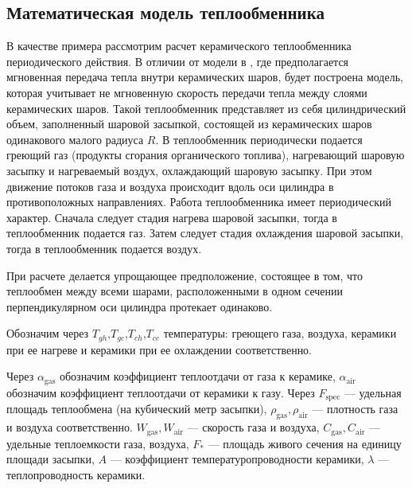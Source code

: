 \documentclass[a4paper,11pt,numreferences,mathsec,kaplist]{isuepsutf8}
\begin{document}
\begin{article}
\section{Математическая модель теплообменника}

В качестве примера рассмотрим расчет керамического теплообменника
периодического действия. В отличии от модели в \cite{KMP2018}, где
предполагается мгновенная передача тепла внутри керамических шаров,
будет построена модель, которая учитывает не мгновенную скорость
передачи тепла между слоями керамических шаров. Такой теплообменник
представляет из себя цилиндрический объем, заполненный шаровой
засыпкой, состоящей из керамических шаров одинакового малого радиуса
$R$. В теплообменник периодически подается греющий газ (продукты
сгорания органического топлива), нагревающий шаровую засыпку и
нагреваемый воздух, охлаждающий шаровую засыпку. При этом движение
потоков газа и воздуха происходит вдоль оси цилиндра в противоположных
направлениях. Работа теплообменника имеет периодический характер.
Сначала следует стадия нагрева шаровой засыпки, тогда в теплообменник
подается газ. Затем следует стадия охлаждения шаровой засыпки, тогда в
теплообменник подается воздух.

При расчете делается упрощающее предположение, состоящее в том, что
теплообмен между всеми шарами, расположенными в одном сечении
перпендикулярном оси цилиндра протекает одинаково.

Обозначим через $T_{gh}$,$T_{gc}$,$T_{ch}$,$T_{cc}$ температуры: греющего
газа, воздуха, керамики при ее нагреве и керамики при ее охлаждении
соответственно.

Через $\alpha_{\text{gas}}$ обозначим коэффициент теплоотдачи от газа к
керамике, $\alpha_{\text{air}}$ обозначим коэффициент теплоотдачи от
керамики к газу. Через $F_{\text{spec}}$  --- удельная площадь теплообмена
(на кубический метр
засыпки), $\rho_{\text{gas}}, \rho_{\text{air}}$ --- плотность газа и воздуха
соответственно. $W_{\text{gas}},W_{\text{air}}$ --- скорость газа и
воздуха, $C_{\text{gas}},C_{\text{air}}$ --- удельные теплоемкости газа,
воздуха, $F_{*}$ --- площадь живого сечения
на единицу площади засыпки, $A$ --- коэффициент температуропроводности керамики,
$\lambda$ --- теплопроводность керамики.


\end{article}
\end{document}

